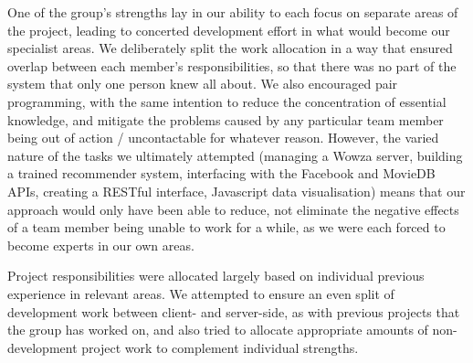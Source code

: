One of the group's strengths lay in our ability to each focus on separate areas of the project, leading to concerted development effort in what would become our specialist areas. We deliberately split the work allocation in a way that ensured overlap between each member's responsibilities, so that there was no part of the system that only one person knew all about. We also encouraged pair programming, with the same intention to reduce the concentration of essential knowledge, and mitigate the problems caused by any particular team member being out of action / uncontactable for whatever reason. However, the varied nature of the tasks we ultimately attempted (managing a Wowza server, building a trained recommender system, interfacing with the Facebook and MovieDB APIs, creating a RESTful interface, Javascript data visualisation) means that our approach would only have been able to reduce, not eliminate the negative effects of a team member being unable to work for a while, as we were each forced to become experts in our own areas.


Project responsibilities were allocated largely based on individual previous experience in relevant areas. We attempted to ensure an even split of development work between client- and server-side, as with previous projects that the group has worked on, and also tried to allocate appropriate amounts of non-development project work to complement individual strengths.


